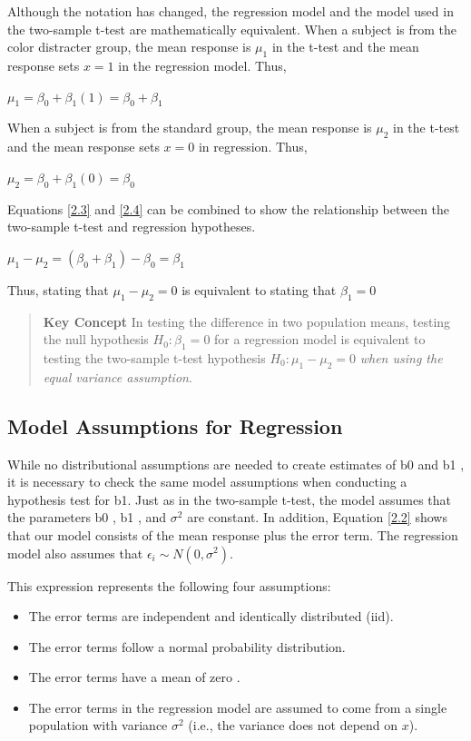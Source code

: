 \documentclass[
]{report}
\providecommand{\tightlist}{%
  \setlength{\itemsep}{0pt}\setlength{\parskip}{0pt}}
\begin{document}
Although the notation has changed, the regression model and the model used in the two-sample t-test are mathematically equivalent. When a subject is from the color distracter group, the mean response is \(\mu_1\) in the t-test and the mean response sets \(x = 1\) in the regression model. Thus,

\(\label{2.3} \mu_1 = \beta_0 + \beta_1(1)  = \beta_0 + \beta_1 \tag{2.3}\)

When a subject is from the standard group, the mean response is \(\mu_2\) in the t-test and the mean response sets \(x = 0\) in regression. Thus,

\(\label{2.4} \mu_2 = \beta_0 + \beta_1(0)  = \beta_0 \tag{2.4}\)

Equations \ref{2.3} and \ref{2.4} can be combined to show the relationship between the two-sample t-test and regression hypotheses.

\(\label{2.5} \mu_1 - \mu_2 = (\beta_0 + \beta_1) -  \beta_0 = \beta_1 \tag{2.5}\)

Thus, stating that \(\mu_1 - \mu_2 = 0\) is equivalent to stating that \(\beta_1 = 0\)

\begin{quote}
\textbf{Key Concept}
In testing the difference in two population means, testing the null hypothesis \(H_0 : \beta_1 = 0\) for a regression model is equivalent to testing the two-sample t-test hypothesis \(H_0 : \mu_1 - \mu_2 = 0\) \emph{when using the equal variance assumption}.
\end{quote}

\subsection{Model Assumptions for Regression}\label{model-assumptions-for-regression}

While no distributional assumptions are needed to create estimates of b0 and b1 , it is necessary to check the same model assumptions when conducting a hypothesis test for b1. Just as in the two-sample t-test, the model assumes that the parameters b0 , b1 , and \(\sigma^2\) are constant. In addition, Equation \ref{2.2} shows that our model consists of the mean response plus the error term. The regression model also assumes that \(\epsilon_i \sim N(0,\sigma^2)\).

This expression represents the following four assumptions:

\begin{itemize}
\tightlist
\item
  The error terms are independent and identically distributed (iid).
\item
  The error terms follow a normal probability distribution.
\item
  The error terms have a mean of zero .
\item
  The error terms in the regression model are assumed to come from a single population with variance \(\sigma^2\) (i.e., the variance does not depend on \(x\)).
\end{itemize}
\end{document}
